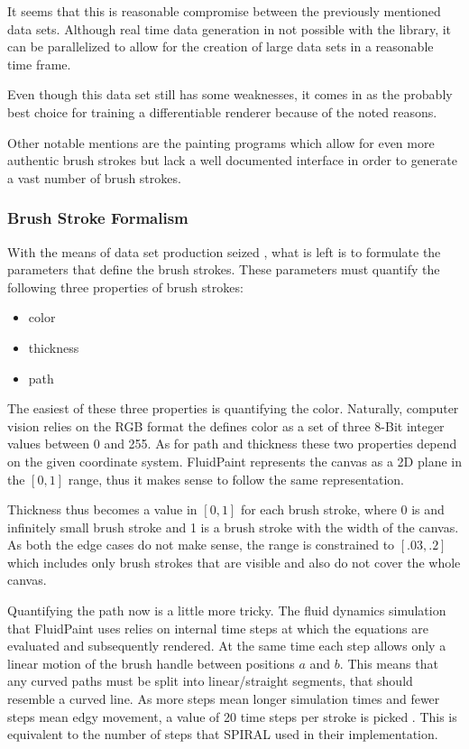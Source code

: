 It seems that this is reasonable compromise between the previously mentioned data sets.
Although real time data generation in not possible with the library, it can be parallelized
to allow for the creation of large data sets in a reasonable time frame.

Even though this data set still has some weaknesses, it comes in as the probably best
choice for training a differentiable renderer because of the noted reasons.


Other notable mentions are the painting programs 
which allow for even more authentic brush strokes but lack a well documented interface
in order to generate a vast number of brush strokes.



\subsubsection{Brush Stroke Formalism}
With the means of data set production seized , what is left
is to formulate the parameters that define the brush strokes.
These parameters must quantify the following three properties of brush strokes:
\begin{itemize}
    \item color
    \item thickness
    \item path
\end{itemize}

The easiest of these three properties is quantifying the color.
Naturally, computer vision relies on the RGB format the defines color as a set of
three 8-Bit integer values between 0 and 255. 
As for path and thickness these two properties depend on the given coordinate system.
FluidPaint represents the canvas as a 2D plane in the $[0, 1]$ range, thus it makes
sense to follow the same representation.

Thickness thus becomes a value in $[0, 1]$  for each brush stroke, where 0 is and
infinitely small brush stroke and 1 is a brush stroke with the width of the canvas.
As both the edge cases do not make sense, the range is constrained to $[.03, .2]$
which includes only brush strokes that are visible and also do not cover the whole canvas.

Quantifying the path now is a little more tricky.
The fluid dynamics simulation that FluidPaint uses relies on internal time steps
at which the equations are evaluated and subsequently rendered.
At the same time each step allows only a linear motion of the brush handle between
positions $a$ and $b$.
This means that any curved paths must be split into linear/straight segments, that
should resemble a curved line.
As more steps mean longer simulation times and fewer steps mean edgy movement, a
value of 20 time steps per stroke is picked .
This is equivalent to the number of steps that SPIRAL used in their implementation.

